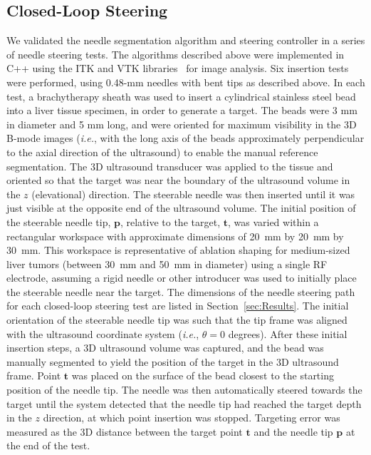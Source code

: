 \subsection{Closed-Loop Steering}
We validated the needle segmentation algorithm and steering controller in a series of needle steering tests. The algorithms described above were implemented in C++ using the ITK and VTK libraries~\cite{ITK2002} for image analysis. Six insertion tests were performed, using 0.48-mm needles with bent tips as described above. In each test, a brachytherapy sheath was used to insert a cylindrical stainless steel bead into a liver tissue specimen, in order to generate a target. The beads were 3 mm in diameter and 5 mm long, and were oriented for maximum visibility in the 3D B-mode images (\textit{i.e.}, with the long axis of the beads approximately perpendicular to the axial direction of the ultrasound) to enable the manual reference segmentation. The 3D ultrasound transducer was applied to the tissue and oriented so that the target was near the boundary of the ultrasound volume in the $z$ (elevational) direction. The steerable needle was then inserted until it was just visible at the opposite end of the ultrasound volume. The initial position of the steerable needle tip, $\bm{p}$, relative to the target, $\bm{t}$, was varied within a rectangular workspace with approximate dimensions of 20~mm by 20~mm by 30~mm. This workspace is representative of ablation shaping for medium-sized liver tumors (between 30~mm and 50~mm in diameter) using a single RF electrode, assuming a rigid needle or other introducer was used to initially place the steerable needle near the target. The dimensions of the needle steering path for each closed-loop steering test are listed in Section~\ref{sec:Results}. The initial orientation of the steerable needle tip was such that the tip frame was aligned with the ultrasound coordinate system (\textit{i.e.}, $\theta = 0$ degrees). After these initial insertion steps, a 3D ultrasound volume was captured, and the bead was manually segmented to yield the position of the target in the 3D ultrasound frame. Point $\bm{t}$ was placed on the surface of the bead closest to the starting position of the needle tip. The needle was then automatically steered towards the target until the system detected that the needle tip had reached the target depth in the $z$ direction, at which point insertion was stopped. Targeting error was measured as the 3D distance between the target point $\bm{t}$ and the needle tip $\bm{p}$ at the end of the test.

